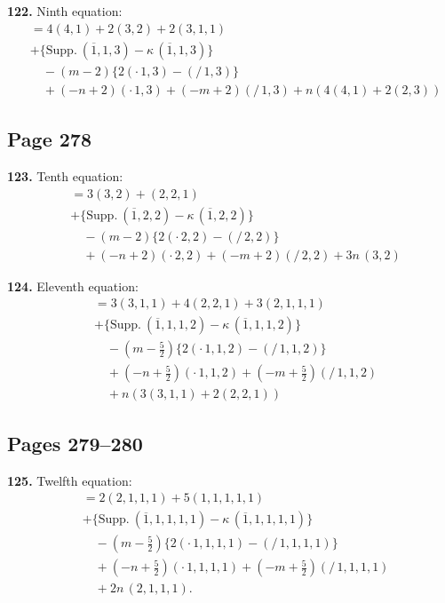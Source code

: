 \documentclass[11pt,a4paper]{article}
\theoremstyle{definition}
\begin{document}
\medskip
\noindent\textbf{122.} Ninth equation:
\begin{align*}
&= 4(4,1) + 2(3,2) + 2(3,1,1)\\
&+ \{\text{Supp.}\ (\overline{1},1,3) - \kappa\,(\overline{1},1,3)\}\\
&\quad - (m - 2)\{2(\cdot\,1,3) - (/\,1,3)\}\\
&\quad + (-n + 2)(\cdot\,1,3) + (-m + 2)(/\,1,3) + n(4(4,1) + 2(2,3))
\end{align*}

\subsection*{Page 278}

\noindent\textbf{123.} Tenth equation:
\begin{align*}
&= 3(3,2) + (2,2,1)\\
&+ \{\text{Supp.}\ (\overline{1},2,2) - \kappa\,(\overline{1},2,2)\}\\
&\quad - (m - 2)\{2(\cdot\,2,2) - (/\,2,2)\}\\
&\quad + (-n + 2)(\cdot\,2,2) + (-m + 2)(/\,2,2) + 3n\,(3,2)
\end{align*}

\medskip
\noindent\textbf{124.} Eleventh equation:
\begin{align*}
&= 3(3,1,1) + 4(2,2,1) + 3(2,1,1,1)\\
&+ \{\text{Supp.}\ (\overline{1},1,1,2) - \kappa\,(\overline{1},1,1,2)\}\\
&\quad - (m - \tfrac{5}{2})\{2(\cdot\,1,1,2) - (/\,1,1,2)\}\\
&\quad + (-n + \tfrac{5}{2})(\cdot\,1,1,2) + (-m + \tfrac{5}{2})(/\,1,1,2)\\
&\quad + n(3(3,1,1) + 2(2,2,1))
\end{align*}

\subsection*{Pages 279--280}

\noindent\textbf{125.} Twelfth equation:
\begin{align*}
&= 2(2,1,1,1) + 5(1,1,1,1,1)\\
&+ \{\text{Supp.}\ (\overline{1},1,1,1,1) - \kappa\,(\overline{1},1,1,1,1)\}\\
&\quad - (m - \tfrac{5}{2})\{2(\cdot\,1,1,1,1) - (/\,1,1,1,1)\}\\
&\quad + (-n + \tfrac{5}{2})(\cdot\,1,1,1,1) + (-m + \tfrac{5}{2})(/\,1,1,1,1)\\
&\quad + 2n\,(2,1,1,1).
\end{align*}
\end{document}
